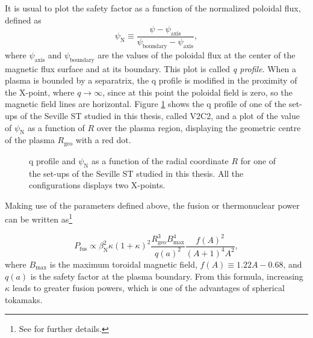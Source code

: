 \documentclass[a4paper,12pt,oneside]{book}
\begin{document}
It is usual to plot the safety factor as a function of the normalized poloidal flux, defined as  
\begin{equation}\label{def psiN}
\psi_\text{N} \equiv \dfrac{\psi - \psi_\text{axis}}{\psi_\text{boundary}-\psi_\text{axis}}, 
\end{equation}
%
where $\psi_\text{axis}$ and $\psi_\text{boundary}$ are the values of the poloidal flux at the center of the magnetic flux surface and at its boundary. This plot is called \textit{q profile}. When a plasma is bounded by a separatrix, the q profile is modified in the proximity of the X-point, where $q \rightarrow \infty$, since at this point the poloidal field is zero, so the magnetic field lines are horizontal. Figure \ref{fig q teor} shows the q profile of one of the set-ups of the Seville ST studied in this thesis, called V2C2, and a plot of the value of $\psi_\text{N}$ as a function of $R$ over the plasma region, displaying the geometric centre of the plasma $R_\text{geo}$ with a red dot.


\begin{figure}
\centering
{}
\hfill
{}
\caption{q profile and $\psi_\text{N}$ as a function of the radial coordinate $R$ for one of the set-ups of the Seville ST studied in this thesis. All the configurations displays two X-points.}
\label{fig q teor}
\end{figure}



Making use of the parameters defined above, the fusion or thermonuclear power can be written as\footnote{See \cite{STpower} for further details.}

\begin{equation}
P_\text{fus} \propto \beta_\text{N}^2 \kappa (1+\kappa)^2 \dfrac{R_\text{geo}^3 B_\text{max}^4}{q(a)^2} \dfrac{f(A)^2}{(A+1)^4 A^2},
\end{equation}
where $B_\text{max}$ is the maximum toroidal magnetic field, $f(A) \equiv 1.22 A-0.68$, and $q(a)$ is the safety factor at the plasma boundary. From this formula, increasing $\kappa$ leads to greater fusion powers, which is one of the advantages of spherical tokamaks.
\end{document}
